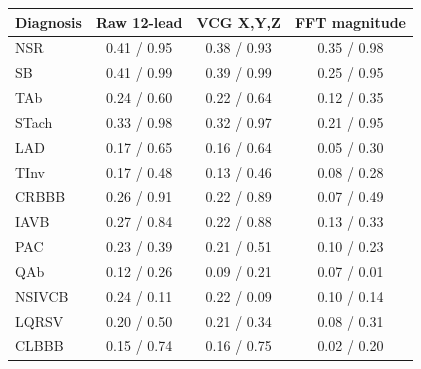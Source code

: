 \caption{Diagnosis-level selective performance at $R\leq0.20$, macro-averaged across the four leave-one-source-out test sets. Entries report positive-class retention / sensitivity among accepted positive records. Each held-out source uses an independently trained model and an abstention threshold certified on its disjoint target calibration subset. PTB-XL and Georgia yielded zero certified coverage and therefore contribute zero to retention; accepted sensitivity is averaged only over sources containing accepted positive records.}
\begin{tabular}{lccc}
\toprule
Diagnosis & Raw 12-lead & VCG X,Y,Z & FFT magnitude \\
\midrule
NSR & 0.41 / 0.95 & 0.38 / 0.93 & 0.35 / 0.98 \\
SB & 0.41 / 0.99 & 0.39 / 0.99 & 0.25 / 0.95 \\
TAb & 0.24 / 0.60 & 0.22 / 0.64 & 0.12 / 0.35 \\
STach & 0.33 / 0.98 & 0.32 / 0.97 & 0.21 / 0.95 \\
LAD & 0.17 / 0.65 & 0.16 / 0.64 & 0.05 / 0.30 \\
TInv & 0.17 / 0.48 & 0.13 / 0.46 & 0.08 / 0.28 \\
CRBBB & 0.26 / 0.91 & 0.22 / 0.89 & 0.07 / 0.49 \\
IAVB & 0.27 / 0.84 & 0.22 / 0.88 & 0.13 / 0.33 \\
PAC & 0.23 / 0.39 & 0.21 / 0.51 & 0.10 / 0.23 \\
QAb & 0.12 / 0.26 & 0.09 / 0.21 & 0.07 / 0.01 \\
NSIVCB & 0.24 / 0.11 & 0.22 / 0.09 & 0.10 / 0.14 \\
LQRSV & 0.20 / 0.50 & 0.21 / 0.34 & 0.08 / 0.31 \\
CLBBB & 0.15 / 0.74 & 0.16 / 0.75 & 0.02 / 0.20 \\
\bottomrule
\end{tabular}
